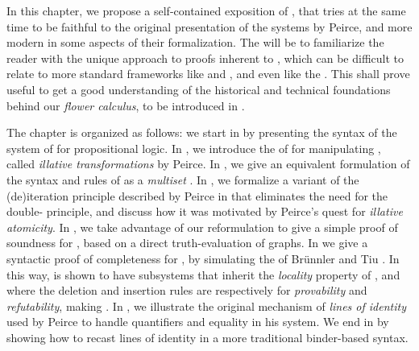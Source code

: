 In this chapter, we propose a self-contained exposition of , that tries
at the same time to be faithful to the original presentation of the systems by
Peirce, and more modern in some aspects of their formalization. The  will be
to familiarize the reader with the unique approach to proofs inherent to
, which can be difficult to relate to more standard frameworks like
 and  , and
even   like the .
This shall prove useful to get a good understanding of the historical and
technical foundations behind our \emph{flower calculus}, to be introduced in
.

The chapter is organized as follows: we start in  by presenting
the  syntax of the system  of  for 
propositional logic. In , we introduce the  of
 for manipulating , called \emph{illative
transformations} by Peirce. In , we give an equivalent
formulation of the syntax and rules of  as a \emph{multiset} . In , we formalize a variant of the (de)iteration
principle described by Peirce in  that
eliminates the need for the double- principle, and discuss how it was
motivated by Peirce's quest for \emph{illative atomicity}. In
, we take advantage of our reformulation to give a simple
proof of soundness for , based on a direct truth-evaluation of graphs.
In  we give a syntactic proof of completeness for
, by simulating the   of Brünnler and
Tiu . In this way,  is shown to have
subsystems that inherit the \emph{locality} property of , and where the
deletion and insertion rules are respectively  for \emph{provability}
and \emph{refutability}, making  \emph{}. In , we
illustrate the original mechanism of \emph{lines of identity} used by Peirce to
handle quantifiers and equality in his  system. We end in
 by showing how to recast lines of identity in a more
traditional binder-based syntax.



